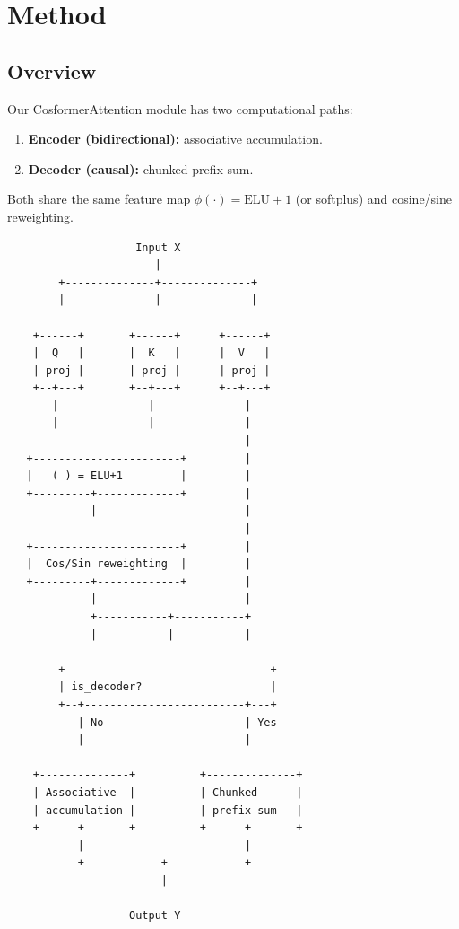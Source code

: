 
\section{Method}

\subsection{Overview}

Our CosformerAttention module has two computational paths:

\begin{enumerate}
\item \textbf{Encoder (bidirectional):} associative accumulation.
\item \textbf{Decoder (causal):} chunked prefix-sum.

\end{enumerate}
Both share the same feature map $\phi(\cdot) = \text{ELU} + 1$ (or softplus) 
and cosine/sine reweighting.

\begin{lstlisting}
                    Input X
                       |
        +--------------+--------------+
        |              |              |
                                       
    +------+       +------+      +------+
    |  Q   |       |  K   |      |  V   |
    | proj |       | proj |      | proj |
    +--+---+       +--+---+      +--+---+
       |              |              |
       |              |              |
                                     |
   +-----------------------+         |
   |   ( ) = ELU+1         |         |
   +---------+-------------+         |
             |                       |
                                     |
   +-----------------------+         |
   |  Cos/Sin reweighting  |         |
   +---------+-------------+         |
             |                       |
             +-----------+-----------+
             |           |           |
                                      
        +--------------------------------+
        | is_decoder?                    |
        +--+-------------------------+---+
           | No                      | Yes
           |                         |
                                      
    +--------------+          +--------------+
    | Associative  |          | Chunked      |
    | accumulation |          | prefix-sum   |
    +------+-------+          +------+-------+
           |                         |
           +------------+------------+
                        |
                         
                   Output Y
\end{lstlisting}

